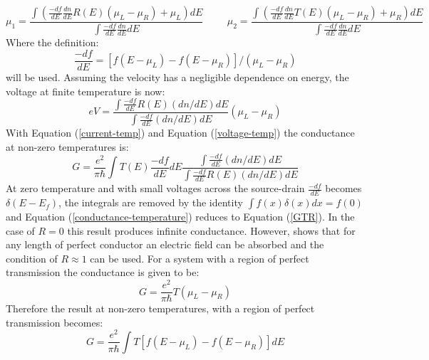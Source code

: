 			\begin{equation}
				\mu_{1}=\frac{\int\left(\frac{-df}{dE}\frac{dn}{dE}R\left(E\right)\left(\mu_{L}-\mu_{R}\right)+\mu_{L}\right)dE}{\int\frac{-df}{dE}\frac{dn}{dE}dE}
				\hspace{1cm}
				\mu_{2}=\frac{\int\left(\frac{-df}{dE}\frac{dn}{dE}T\left(E\right)\left(\mu_{L}-\mu_{R}\right)+\mu_{R}\right)dE}{\int\frac{-df}{dE}\frac{dn}{dE}dE}
			\end{equation}
 			Where the definition:
			\begin{equation}
				\frac{-df}{dE}=\left[f\left(E-\mu_{L}\right)-f\left(E-\mu_{R}\right)\right]/\left(\mu_{L}-\mu_{R}\right)
			\end{equation}
			will be used. Assuming the velocity has a negligible dependence on energy, the voltage at finite temperature is now:
			\begin{equation}
				eV=\frac{\int \frac{-df}{dE}R\left(E\right) \left(dn/dE\right)dE}{\int \frac{-df}{dE}\left(dn/dE\right)dE}\left(\mu_{L}-\mu_{R}\right)
				\label{voltage-temp}
			\end{equation}
			With Equation (\ref{current-temp}) and Equation (\ref{voltage-temp}) the conductance at non-zero temperatures is:
			\begin{equation}
				G=\frac{e^{2}}{\pi\hbar}\int T\left(E\right)\frac{-df}{dE} dE \frac{\int \frac{-df}{dE}\left(dn/dE\right)dE}{\int \frac{-df}{dE}R\left(E\right) \left(dn/dE\right)dE}
				\label{conductance-temperature}
			\end{equation}
			At zero temperature and with small voltages across the source-drain $\frac{-df}{dE}$ becomes $\delta \left(E-E_{f}\right)$, the integrals are removed by the identity $\int f(x)\delta(x) dx=f(0)$ and Equation (\ref{conductance-temperature}) reduces to Equation (\ref{GTR}). In the case of $R=0$ this result produces infinite conductance. However, \cite{b7} shows that for any length of perfect conductor an electric field can be absorbed and the condition of $R\approx 1$ can be used. For a system with a region of perfect transmission the conductance is given to be:
			\begin{equation}
				G=\frac{e^{2}}{\pi\hbar}T\left(\mu_{L}-\mu_{R}\right)
			\end{equation}
			Therefore the result at non-zero temperatures, with a region of perfect transmission becomes:
			\begin{equation}
				G=\frac{e^{2}}{\pi\hbar}\int T\left[f\left(E-\mu_{L}\right)-f\left(E-\mu_{R}\right)\right]dE
			\end{equation}
